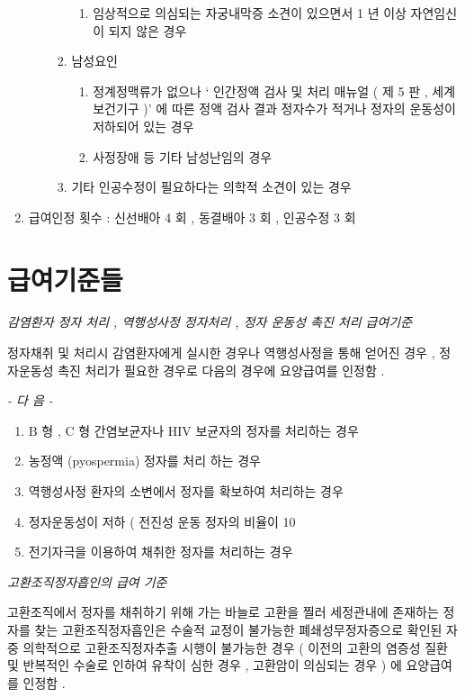 \begin{enumerate}[가.]
\begin{enumerate}[1)]
\begin{enumerate}[가)]
\begin{enumerate}[(1)]
			\item 임상적으로 의심되는 자궁내막증 소견이 있으면서  1 년  이상 자연임신이 되지 않은 경우 
			\end{enumerate}		
		\item 남성요인 
			\begin{enumerate}[(1)]\tightlist
			\item 정계정맥류가 없으나  ‘ 인간정액 검사 및 처리 매뉴얼 ( 제 5 판 ,  세계보건기구 )’ 에 따른 정액 검사 결과 정자수가 적거나 정자의 운동성이 저하되어  있는 경우 
			\item 사정장애 등 기타 남성난임의 경우 
			\end{enumerate}
		\item 기타 인공수정이 필요하다는 의학적 소견이 있는 경우 
		\end{enumerate}
   \end{enumerate}
\item 급여인정 횟수 :  신선배아  4 회 ,  동결배아  3 회 ,  인공수정  3 회  
\end{enumerate}
 

\section{급여기준들}
\par 
\emph{감염환자 정자 처리 ,  역행성사정  정자처리 ,  정자 운동성 촉진 처리  급여기준} \par
정자채취 및 처리시 감염환자에게 실시한 경우나 역행성사정을 통해 얻어진 경우 ,  정자운동성 촉진 처리가 필요한 경우로 다음의 경우에 요양급여를 인정함 . \par
\emph{-  다 음  -}\par  
\begin{enumerate}[가.]\tightlist
\item B 형 , C 형 간염보균자나  HIV  보균자의 정자를 처리하는 경우 
\item 농정액 (pyospermia)  정자를 처리 하는 경우 
\item 역행성사정 환자의 소변에서 정자를 확보하여 처리하는 경우 
\item 정자운동성이 저하 ( 전진성 운동 정자의 비율이  10%
\item 전기자극을 이용하여 채취한 정자를 처리하는 경우 
\end{enumerate}

\emph{고환조직정자흡인의 급여 기준}\par 
고환조직에서 정자를 채취하기 위해 가는 바늘로 고환을 찔러  세정관내에 존재하는 정자를 찾는 고환조직정자흡인은 수술적  교정이 불가능한 폐쇄성무정자증으로 확인된 자 중 의학적으로  고환조직정자추출 시행이 불가능한 경우 ( 이전의  고환의 염증성  질환 및 반복적인 수술로 인하여 유착이 심한 경우 ,  고환암이 의심되는 경우 ) 에 요양급여를 인정함 . \par
 

